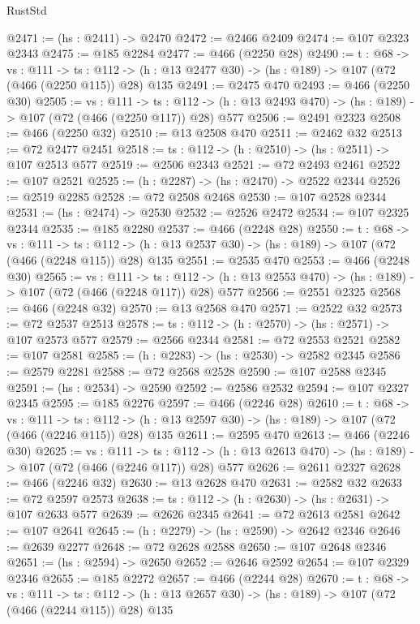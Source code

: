 \begin{lexlean}{RustStd}
\begin{coremodule}
{\begin{coremodule}
{{{{@2471 := (hs : @2411) -> @2470
@2472 := @2466 @2409
@2474 := @107 @2323 @2343
@2475 := @185 @2284
@2477 := @466 (@2250 @28)
@2490 := {t : @68} ->
  {vs : @111} ->
  {ts : @112} -> (h : @13 @2477 @30) -> (hs : @189) -> @107 (@72 (@466 (@2250 @115)) @28) @135
@2491 := @2475 @470
@2493 := @466 (@2250 @30)
@2505 := {vs : @111} ->
  {ts : @112} -> (h : @13 @2493 @470) -> (hs : @189) -> @107 (@72 (@466 (@2250 @117)) @28) @577
@2506 := @2491 @2323
@2508 := @466 (@2250 @32)
@2510 := @13 @2508 @470
@2511 := @2462 @32
@2513 := @72 @2477 @2451
@2518 := {ts : @112} -> (h : @2510) -> (hs : @2511) -> @107 @2513 @577
@2519 := @2506 @2343
@2521 := @72 @2493 @2461
@2522 := @107 @2521
@2525 := (h : @2287) -> (hs : @2470) -> @2522 @2344
@2526 := @2519 @2285
@2528 := @72 @2508 @2468
@2530 := @107 @2528 @2344
@2531 := (hs : @2474) -> @2530
@2532 := @2526 @2472
@2534 := @107 @2325 @2344
@2535 := @185 @2280
@2537 := @466 (@2248 @28)
@2550 := {t : @68} ->
  {vs : @111} ->
  {ts : @112} -> (h : @13 @2537 @30) -> (hs : @189) -> @107 (@72 (@466 (@2248 @115)) @28) @135
@2551 := @2535 @470
@2553 := @466 (@2248 @30)
@2565 := {vs : @111} ->
  {ts : @112} -> (h : @13 @2553 @470) -> (hs : @189) -> @107 (@72 (@466 (@2248 @117)) @28) @577
@2566 := @2551 @2325
@2568 := @466 (@2248 @32)
@2570 := @13 @2568 @470
@2571 := @2522 @32
@2573 := @72 @2537 @2513
@2578 := {ts : @112} -> (h : @2570) -> (hs : @2571) -> @107 @2573 @577
@2579 := @2566 @2344
@2581 := @72 @2553 @2521
@2582 := @107 @2581
@2585 := (h : @2283) -> (hs : @2530) -> @2582 @2345
@2586 := @2579 @2281
@2588 := @72 @2568 @2528
@2590 := @107 @2588 @2345
@2591 := (hs : @2534) -> @2590
@2592 := @2586 @2532
@2594 := @107 @2327 @2345
@2595 := @185 @2276
@2597 := @466 (@2246 @28)
@2610 := {t : @68} ->
  {vs : @111} ->
  {ts : @112} -> (h : @13 @2597 @30) -> (hs : @189) -> @107 (@72 (@466 (@2246 @115)) @28) @135
@2611 := @2595 @470
@2613 := @466 (@2246 @30)
@2625 := {vs : @111} ->
  {ts : @112} -> (h : @13 @2613 @470) -> (hs : @189) -> @107 (@72 (@466 (@2246 @117)) @28) @577
@2626 := @2611 @2327
@2628 := @466 (@2246 @32)
@2630 := @13 @2628 @470
@2631 := @2582 @32
@2633 := @72 @2597 @2573
@2638 := {ts : @112} -> (h : @2630) -> (hs : @2631) -> @107 @2633 @577
@2639 := @2626 @2345
@2641 := @72 @2613 @2581
@2642 := @107 @2641
@2645 := (h : @2279) -> (hs : @2590) -> @2642 @2346
@2646 := @2639 @2277
@2648 := @72 @2628 @2588
@2650 := @107 @2648 @2346
@2651 := (hs : @2594) -> @2650
@2652 := @2646 @2592
@2654 := @107 @2329 @2346
@2655 := @185 @2272
@2657 := @466 (@2244 @28)
@2670 := {t : @68} ->
  {vs : @111} ->
  {ts : @112} -> (h : @13 @2657 @30) -> (hs : @189) -> @107 (@72 (@466 (@2244 @115)) @28) @135
}}}}
\end{coremodule}}
\end{coremodule}
\end{lexlean}
